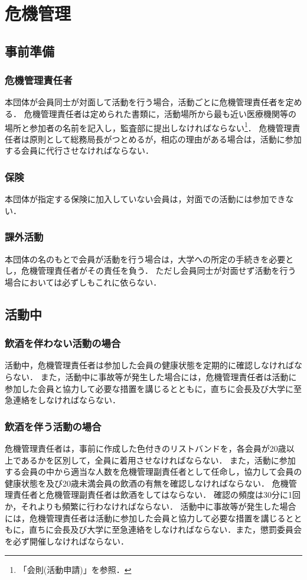 \documentclass{ltjsarticle}
\begin{document}
  \section{危機管理}
    \subsection{事前準備}
      \subsubsection{危機管理責任者}
        \jor
        本団体が会員同士が対面して活動を行う場合，活動ごとに危機管理責任者を定める．
        危機管理責任者は定められた書類に，活動場所から最も近い医療機関等の場所と参加者の名前を記入し，監査部に提出しなければならない\footnote{「会則(活動申請)」を参照．}．
        危機管理責任者は原則として総務局長がつとめるが，相応の理由がある場合は，活動に参加する会員に代行させなければならない．
      \subsubsection{保険}
        \jor
        本団体が指定する保険に加入していない会員は，対面での活動には参加できない．
      \subsubsection{課外活動}
        本団体の名のもとで会員が活動を行う場合は，大学への所定の手続きを必要とし，危機管理責任者がその責任を負う．
        ただし会員同士が対面せず活動を行う場合においては必ずしもこれに依らない．
    \subsection{活動中}
      \subsubsection{飲酒を伴わない活動の場合}
        \jor
        活動中，危機管理責任者は参加した会員の健康状態を定期的に確認しなければならない．
        また，活動中に事故等が発生した場合には，危機管理責任者は活動に参加した会員と協力して必要な措置を講じるとともに，直ちに会長及び大学に至急連絡をしなければならない．
      \subsubsection{飲酒を伴う活動の場合}
        \jor
        危機管理責任者は，事前に作成した色付きのリストバンドを，各会員が20歳以上であるかを区別して，全員に着用させなければならない．
        また，活動に参加する会員の中から適当な人数を危機管理副責任者として任命し，協力して会員の健康状態を及び20歳未満会員の飲酒の有無を確認しなければならない．
        危機管理責任者と危機管理副責任者は飲酒をしてはならない．
        確認の頻度は30分に1回か，それよりも頻繁に行わなければならない．
        活動中に事故等が発生した場合には，危機管理責任者は活動に参加した会員と協力して必要な措置を講じるとともに，直ちに会長及び大学に至急連絡をしなければならない．また，懲罰委員会を必ず開催しなければならない．
\end{document}
